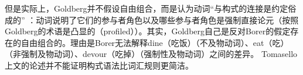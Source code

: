 \noindent
    但是实际上，Goldberg并不假设自由组合，而是认为动词“与构式的连接是约定俗成的” \citep[]{Goldberg95a}：动词说明了它们的参与者角色以及哪些参与者角色是强制直接论元（按照Goldberg的术语是凸显的（profiled））。其实，Goldberg自己\citeyearpar[]{Goldberg2006a}是反对Borer的假定存在的自由组合的\citeyearpar{Borer2003a-u}。理由是Borer无法解释dine（吃饭）（不及物动词）、eat（吃）（非强制及物动词）、devour（吃掉）（强制性及物动词）之间的差异。
Tomasello上文的论述并不能证明构式语法比词汇规则更简洁。


